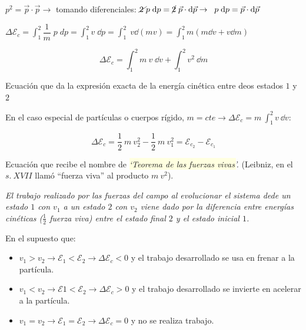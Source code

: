 $p^2=\vec p\cdot \vec p \to $ tomando diferenciales: $\cancel{2\;} p\;\dd  p= \cancel{2}\; \vec p \cdot \dd \vec p \to\;\; p\;\dd p=\vec p \cdot \dd \vec p$

$\Delta \mathcal E_c=\displaystyle \int_1^2 \dfrac 1 m \;p\; dp=\int_1^2 v\;\dd p =\int_1^2\; v  \dd (mv)=\int_1^2 m (m\dd v + v\dd m)$

\begin{equation}
	\Delta \mathcal E_c=\displaystyle\int_1^2 m\ v\;\dd v + \int_1^2 v^2 \ \dd m
\end{equation}

Ecuación que da la expresión exacta de la energía cinética entre deos estados $1$ y $2$


En el caso especial de partículas o cuerpos rígido, $ m=cte  \to  \Delta \mathcal E_c= \displaystyle m\ \int_1^2 v \ \dd v $:

\begin{equation}
\label{fuerzas-vivas}
\Delta \mathcal E_c= \frac 1 2 \ m \ v_2^2 - \frac 1 2 \ m \ v_1^2 = \mathcal E_{c_2}-\mathcal E_{c_1}
\end{equation}

Ecuación que recibe el nombre de \emph{\colorbox{LightYellow}{`Teorema de las fuerzas vivas'}.}
(Leibniz, en el $s.\ XVII$ llamó ``fuerza viva'' al producto $m \ v^2$).

\emph{El trabajo realizado por las fuerzas del campo al evolucionar el sistema dede un estado $1$ con $v_1$ a un estado $2$ con $v_2$ viene dado por la diferencia entre energías cinéticas ($\frac 1 2$ fuerza viva) entre el estado final $2$ y el estado inicial $1$.}


En el supuesto que:
\vspace{-2mm}\begin{itemize}
\vspace{-2mm}\item $v_1>v_2 \to \mathcal E_1 < \mathcal E_2 \to \Delta \mathcal E_c<0$ y el trabajo desarrollado se usa en frenar a la partícula.
\vspace{-2mm}\item $v_1<v_2 \to \mathcal E1 < \mathcal E_2 \to \Delta \mathcal E_c>0$ y el trabajo desarrollado se invierte en acelerar a la partícula.
\vspace{-2mm}\item $v_1=v_2 \to \mathcal E_1 = \mathcal E_2 \to \Delta \mathcal E_c=0$ y no se realiza trabajo. 	
\end{itemize}


